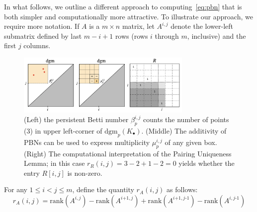 \documentclass[10pt]{article}
\newcommand{\+}{%
	\raisebox{0.18ex}{\scaleobj{0.55}{+}}
}
\theoremstyle{definition}
\begin{document}


In what follows, we outline a different approach to computing~\eqref{eq:pbn} that is both simpler and computationally more attractive. 
To illustrate our approach, we require more notation. If $A$ is a $m \times n$ matrix, let $A^{i, j}$ denote the lower-left submatrix defined by last $m - i + 1$ rows (rows $i$ through $m$, inclusive) and the first $j$ columns. 
\begin{figure}
\centering
	\includegraphics[width=0.75\textwidth]{fig1}
	\caption{(Left) the persistent Betti number $\beta_p^{i,j}$ counts the number of points (3) in upper left-corner of $\mathrm{dgm}_p(K_\bullet)$. (Middle) The additivity of PBNs can be used to express multiplicity $\mu_p^{i,j}$ of any given box. (Right) The computational interpretation of the Pairing Uniqueness Lemma; in this case $r_R(i,j) = 3 - 2 + 1 - 2 = 0$ yields whether the entry $R[i,j]$ is non-zero.}
	\label{fig:mult}
\end{figure}
For any $1 \leq i < j \leq m$, define the quantity $r_A(i,j)$ as follows:
\begin{equation}
	r_A(i,j) = \mathrm{rank}(A^{i,j}) - \mathrm{rank}(A^{i\texttt{+}1,j}) + \mathrm{rank}(A^{i\texttt{+}1,j\text{-}1}) - \mathrm{rank}(A^{i,j\text{-}1})
\end{equation}
\end{document}
